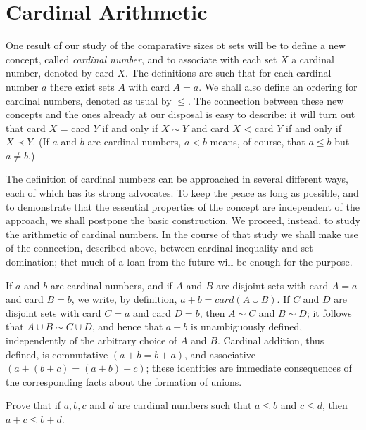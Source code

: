
\chapter{Cardinal Arithmetic} 

One result of our study of the comparative sizes ot sets will be to define a new concept, called \textit{cardinal number}, and to associate with each set $X$ a cardinal number, denoted by card $X$. The definitions are such that for each cardinal number $a$ there exist sets $A$ with card $A = a$. We shall also define an ordering for cardinal numbers, denoted as usual by $\le$. The connection between these new concepts and the ones already at our disposal is easy to describe: it will turn out that card $X$ = card $Y$ if and only if $X \sim Y$ and card $X$ < card $Y$ if and only if $X \prec Y$. (If $a$ and $b$ are cardinal numbers, $a < b$ means, of course, that $a \le b$ but $a \neq b$.)

The definition of cardinal numbers can be approached in several different ways, each of which has its strong advocates. To keep the peace as long as possible, and to demonstrate that the essential properties of the concept are independent of the approach, we shall postpone the basic construction. We proceed, instead, to study the arithmetic of cardinal numbers. In the course of that study we shall make use of the connection, described above, between cardinal inequality and set domination; thet much of a loan from the future will be enough for the purpose.

If $a$ and $b$ are cardinal numbers, and if $A$ and $B$ are disjoint sets with card $A = a$ and card $B = b$, we write, by definition, $a + b = card (A \cup B)$. If $C$ and $D$ are disjoint sets with card $C = a$ and card $D = b$, then $A \sim C$ and $B \sim D$; it follows that $A \cup B \sim C \cup D$, and hence that $a + b$ is unambiguously defined, independently of the arbitrary choice of $A$ and $B$. Cardinal addition, thus defined, is commutative $(a + b = b + a)$, and associative $(a + (b + c) = (a + b) + c)$; these identities are immediate consequences of the corresponding facts about the formation of unions.

\begin{named}[EXERCISE. ] Prove that if $a, b, c$ and $d$ are cardinal numbers such that $a \le b$ and $c \le d$, then $a + c \le b + d$. 
\end{named}

